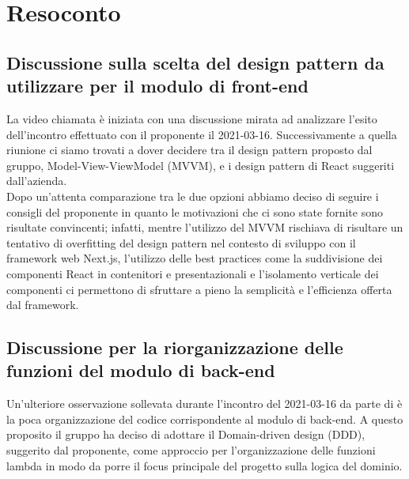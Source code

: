 \section{Resoconto}
\subsection{Discussione sulla scelta del design pattern da utilizzare per il modulo di front-end}
La video chiamata è iniziata con una discussione mirata ad analizzare l'esito dell'incontro effettuato con il proponente \Proponente{} il 2021-03-16. Successivamente a quella riunione ci siamo trovati a dover decidere tra il design pattern proposto dal gruppo, Model-View-ViewModel (MVVM), e i design pattern di React suggeriti dall'azienda.\\
Dopo un'attenta comparazione tra le due opzioni abbiamo deciso di seguire i consigli del proponente in quanto le motivazioni che ci sono state fornite sono risultate convincenti; infatti, mentre l'utilizzo del MVVM rischiava di risultare un tentativo di overfitting del design pattern nel contesto di sviluppo con il framework web Next.js, l'utilizzo delle best practices come la suddivisione dei componenti React in contenitori e presentazionali e l'isolamento verticale dei componenti ci permettono di sfruttare a pieno la semplicità e l'efficienza offerta dal framework.
\subsection{Discussione per la riorganizzazione delle funzioni del modulo di back-end}
Un'ulteriore osservazione sollevata durante l'incontro del 2021-03-16 da parte di \Proponente{} è la poca organizzazione del codice corrispondente al modulo di back-end. A questo proposito il gruppo ha deciso di adottare il Domain-driven design (DDD), suggerito dal proponente, come approccio per l'organizzazione delle funzioni lambda in modo da porre il focus principale del progetto sulla logica del dominio.